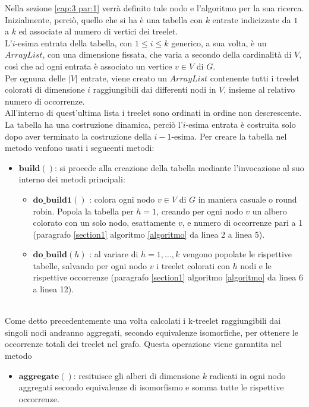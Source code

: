 Nella sezione \ref{cap:3 par:1} verr\`a definito tale nodo e l'algoritmo per la sua ricerca.\\
Inizialmente, perci\`o, quello che si ha \`e una tabella con $ k $ entrate indicizzate da $ 1 $ a $ k $ ed associate al numero di vertici dei treelet.\\
L'$ i $-esima entrata della tabella, con $ 1\le i \le k $ generico, a sua volta, \`e un $ ArrayList $, con una dimensione fissata, che varia a secondo della cardinalit\`a di $ V $, cos\`i che ad ogni entrata \`e associato un vertice $ v\in V $ di $ G $.\\
Per ognuna delle $ |V| $ entrate, viene creato un $ ArrayList $ contenente tutti i treelet colorati di dimensione $ i $ raggiungibili dai differenti nodi in $ V $, insieme al relativo numero di occorrenze.\\
All'interno di quest'ultima lista i treelet sono ordinati in ordine non descrescente.\\
La tabella ha una costruzione dinamica, perci\`o l'$ i $-esima entrata \`e costruita solo dopo aver terminato la costruzione della $ i-1 $-esima.
Per creare la tabella nel metodo venfono usati i segueenti metodi:
\begin{itemize}
	\item $ \textbf{build}() $: si procede alla creazione della tabella mediante l'invocazione al suo interno dei metodi principali:
	\begin{itemize}
		\item $\textbf{do\_build1}()$ : colora ogni nodo $ v\in V $ di $ G $ in maniera casuale o round robin. Popola la tabella per $ h=1 $, creando per ogni nodo $ v $ un albero colorato con un solo nodo, esattamente $ v $, e numero di occorrenze pari a 1 (paragrafo \ref{section1} algoritmo \ref{algoritmo} da linea 2 a linea 5).
		\item  $\textbf{do\_build}(h)$ : al variare di $ h = 1,\dots,k $ vengono popolate le rispettive tabelle, salvando per ogni nodo $ v $ i treelet colorati con $ h $ nodi e le rispettive occorrenze (paragrafo \ref{section1} algoritmo \ref{algoritmo} da linea 6 a linea 12).	
	\end{itemize}
\end{itemize}\mbox{}\\
Come detto precedentemente una volta calcolati i k-treelet raggiungibili dai singoli nodi andranno aggregati, secondo equivalenze isomorfiche, per ottenere le occorrenze totali dei treelet nel grafo.
Questa operazione viene garantita nel metodo
\begin{itemize}
	\item $ \textbf{aggregate}() $: resituisce gli alberi di dimensione $ k $ radicati in ogni nodo aggregati secondo equivalenze di isomorfismo e somma tutte le rispettive occorrenze.  
\end{itemize}\mbox{}\\
